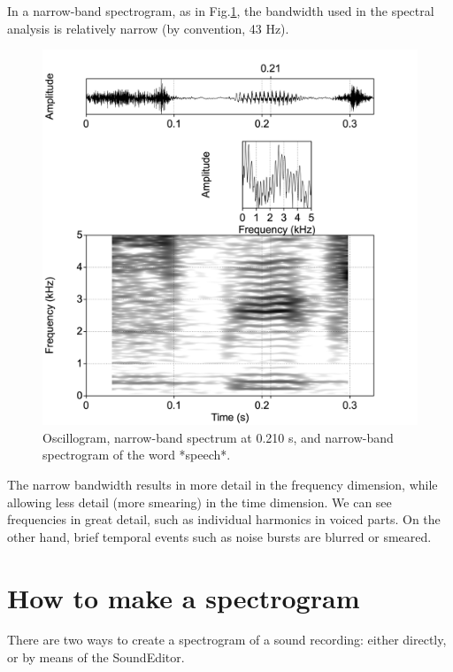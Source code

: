 \documentclass[
]{book}
\begin{document}
In a narrow-band spectrogram, as in Fig.\ref{fig:speech-word-spectrogram-narrow}, the bandwidth used in the spectral analysis is relatively narrow (by convention, 43 Hz).

\begin{figure}

{\centering \includegraphics{figures/speech_word_spectrogram_30ms} 

}

\caption{Oscillogram, narrow-band spectrum at 0.210 s, and narrow-band spectrogram of the word *speech*.}\label{fig:speech-word-spectrogram-narrow}
\end{figure}

The narrow bandwidth results in more detail in the frequency dimension, while allowing less detail (more smearing) in the time dimension. We can see frequencies in great detail, such as individual harmonics in voiced parts. On the other hand, brief temporal events such as noise bursts are blurred or smeared.

\label{box-praatspectrogram}
\section{How to make a spectrogram}\label{sec:howto-spectrogram}

There are two ways to create a spectrogram of a sound recording: either directly, or by means of the SoundEditor.
\end{document}
